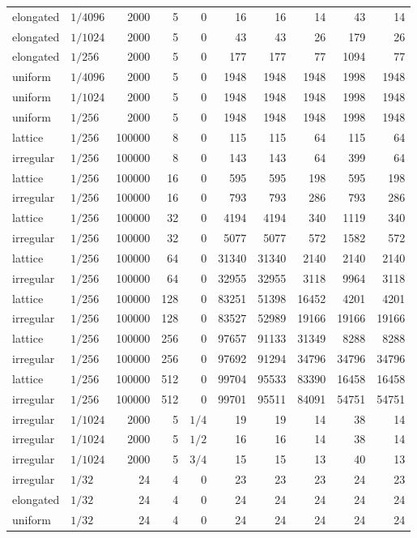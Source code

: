 \documentclass[a4paper,12pt]{article}
\let\articleNormal\normalsize \let\articleSmall\small \let\articleFoot\footnotesize
\let\normalsize\articleNormal \let\small\articleSmall \let\footnotesize\articleFoot
\numberwithin{equation}{section}
\begin{document}
\begin{longtable}{@{}llrrrrrrrr@{}}
elongated & $1/4096$ & 2000 & 5 & $0$ & 16 & 16 & 14 & 43 & 14\\
elongated & $1/1024$ & 2000 & 5 & $0$ & 43 & 43 & 26 & 179 & 26\\
elongated & $1/256$ & 2000 & 5 & $0$ & 177 & 177 & 77 & 1094 & 77\\
uniform & $1/4096$ & 2000 & 5 & $0$ & 1948 & 1948 & 1948 & 1998 & 1948\\
uniform & $1/1024$ & 2000 & 5 & $0$ & 1948 & 1948 & 1948 & 1998 & 1948\\
uniform & $1/256$ & 2000 & 5 & $0$ & 1948 & 1948 & 1948 & 1998 & 1948\\
lattice & $1/256$ & 100000 & 8 & $0$ & 115 & 115 & 64 & 115 & 64\\
irregular & $1/256$ & 100000 & 8 & $0$ & 143 & 143 & 64 & 399 & 64\\
lattice & $1/256$ & 100000 & 16 & $0$ & 595 & 595 & 198 & 595 & 198\\
irregular & $1/256$ & 100000 & 16 & $0$ & 793 & 793 & 286 & 793 & 286\\
lattice & $1/256$ & 100000 & 32 & $0$ & 4194 & 4194 & 340 & 1119 & 340\\
irregular & $1/256$ & 100000 & 32 & $0$ & 5077 & 5077 & 572 & 1582 & 572\\
lattice & $1/256$ & 100000 & 64 & $0$ & 31340 & 31340 & 2140 & 2140 & 2140\\
irregular & $1/256$ & 100000 & 64 & $0$ & 32955 & 32955 & 3118 & 9964 & 3118\\
lattice & $1/256$ & 100000 & 128 & $0$ & 83251 & 51398 & 16452 & 4201 & 4201\\
irregular & $1/256$ & 100000 & 128 & $0$ & 83527 & 52989 & 19166 & 19166 & 19166\\
lattice & $1/256$ & 100000 & 256 & $0$ & 97657 & 91133 & 31349 & 8288 & 8288\\
irregular & $1/256$ & 100000 & 256 & $0$ & 97692 & 91294 & 34796 & 34796 & 34796\\
lattice & $1/256$ & 100000 & 512 & $0$ & 99704 & 95533 & 83390 & 16458 & 16458\\
irregular & $1/256$ & 100000 & 512 & $0$ & 99701 & 95511 & 84091 & 54751 & 54751\\
irregular & $1/1024$ & 2000 & 5 & $1/4$ & 19 & 19 & 14 & 38 & 14\\
irregular & $1/1024$ & 2000 & 5 & $1/2$ & 16 & 16 & 14 & 38 & 14\\
irregular & $1/1024$ & 2000 & 5 & $3/4$ & 15 & 15 & 13 & 40 & 13\\
irregular & $1/32$ & 24 & 4 & $0$ & 23 & 23 & 23 & 24 & 23\\
elongated & $1/32$ & 24 & 4 & $0$ & 24 & 24 & 24 & 24 & 24\\
uniform & $1/32$ & 24 & 4 & $0$ & 24 & 24 & 24 & 24 & 24\\
\bottomrule\end{longtable}\normalsize
\end{document}
